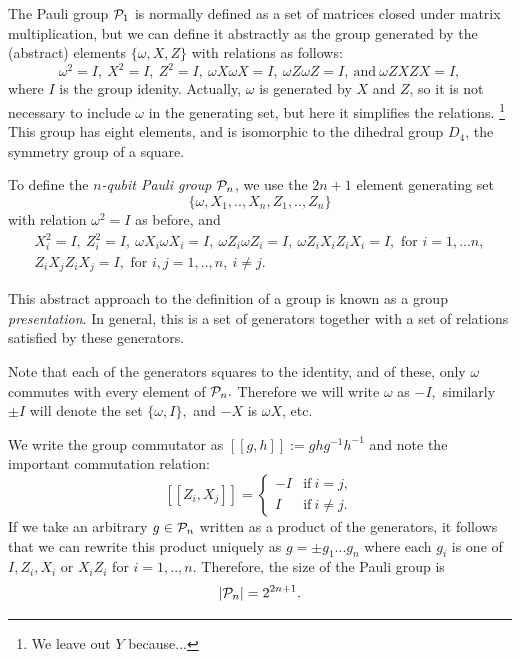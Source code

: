 \documentclass[12pt]{article}
\begin{document}
The Pauli group $\mathcal{P}_1$ is normally 
defined as a set of matrices closed under
matrix multiplication, but we can define
it abstractly
as the group generated
by the (abstract) elements $\{\omega, X, Z\}$ with
relations as follows:
$$
\omega^2=I,\ X^2=I,\ Z^2=I,\ \omega X\omega X=I,\ \omega Z\omega Z=I,\ \mbox{and}\  \omega ZXZX=I,
$$
where $I$ is the group idenity.
Actually, $\omega $ is generated by $X$ and $Z$, so
it is not necessary to include $\omega $ in the generating set,
but here it simplifies the relations.
\footnote{We leave out $Y$ because...}
This group has eight elements, and is isomorphic to the dihedral group $D_4$,
the symmetry group of a square.

To define
the {\it $n$-qubit Pauli group} $\mathcal{P}_n$, 
we use the $2n+1$ element 
generating set 
$$\{\omega , X_1, .., X_n, Z_1, .., Z_n\}$$
with relation $\omega^2=I$ as before, and
\begin{equation}\label{presentation}
\begin{array}{c}
X_i^2=I,\ Z_i^2=I,\ \omega X_i\omega X_i=I,\ \omega Z_i\omega Z_i=I,\ \omega Z_iX_iZ_iX_i=I, 
\mbox{\ for\ } i=1,...n,\\
Z_iX_jZ_iX_j=I, \mbox{\ for\ } i, j = 1,..,n,\ i\ne j.
\end{array}
\end{equation}

This abstract approach to the definition of a group is known as
a group {\it presentation}. In general, this is a set of
generators together with a set of relations satisfied
by these generators.

Note that each of the generators squares to the identity,
and of these, only $\omega$ commutes with every element of $\mathcal{P}_n.$
Therefore we will write $\omega$ as $-I,$
similarly $\pm I$ will denote the
set $\{\omega, I\},$ and $-X$ is $\omega X$, etc.

We write the group commutator as
$[[g, h]]:=ghg^{-1}h^{-1}$
and note the important commutation relation:
$$
    [[Z_i, X_j]] = 
    \left\{ \begin{array}{ll}
 -I &\mbox{if}\ i=j,\\
 I &\mbox{if}\ i\ne j.\end{array}\right.
$$
If we take an arbitrary $g\in \mathcal{P}_n$
written as a product of the generators,
it follows that we can rewrite this
product uniquely as %
$ g = \pm g_1 ... g_n $
where each $g_i$ is one of $I, Z_i, X_i$ or $X_i Z_i$
for $i=1,..,n.$
Therefore, the size of the
Pauli group is 
$$
    |\mathcal{P}_n| = 2^{2n+1}.
$$
\end{document}
